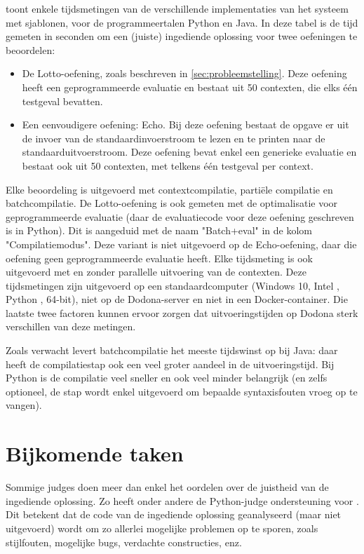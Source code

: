  toont enkele tijdsmetingen van de verschillende implementaties van het systeem met sjablonen, voor de programmeertalen Python en Java.
In deze tabel is de tijd gemeten in seconden om een (juiste) ingediende oplossing voor twee oefeningen te beoordelen:

\begin{itemize}
    \item De Lotto-oefening, zoals beschreven in \cref{sec:probleemstelling}.
    Deze oefening heeft een geprogrammeerde evaluatie en bestaat uit 50 contexten, die elks één testgeval bevatten.
    \item Een eenvoudigere oefening: Echo.
    Bij deze oefening bestaat de opgave er uit de invoer van de standaardinvoerstroom te lezen en te printen naar de standaarduitvoerstroom.
    Deze oefening bevat enkel een generieke evaluatie en bestaat ook uit 50 contexten, met telkens één testgeval per context.
\end{itemize}

Elke beoordeling is uitgevoerd met contextcompilatie, partiële compilatie en batchcompilatie.
De Lotto-oefening is ook gemeten met de optimalisatie voor geprogrammeerde evaluatie (daar de evaluatiecode voor deze oefening geschreven is in Python).
Dit is aangeduid met de naam "Batch+eval" in de kolom "Compilatiemodus".
Deze variant is niet uitgevoerd op de Echo-oefening, daar die oefening geen geprogrammeerde evaluatie heeft.
Elke tijdsmeting is ook uitgevoerd met en zonder parallelle uitvoering van de contexten.
Deze tijdsmetingen zijn uitgevoerd op een standaardcomputer (Windows 10, Intel , Python , 64-bit), niet op de Dodona-server en niet in een Docker-container.
Die laatste twee factoren kunnen ervoor zorgen dat uitvoeringstijden op Dodona sterk verschillen van deze metingen.

Zoals verwacht levert batchcompilatie het meeste tijdswinst op bij Java: daar heeft de compilatiestap ook een veel groter aandeel in de uitvoeringstijd.
Bij Python is de compilatie veel sneller en ook veel minder belangrijk (en zelfs optioneel, de stap wordt enkel uitgevoerd om bepaalde syntaxisfouten vroeg op te vangen).

\section{Bijkomende taken}\label{sec:andere-taken}

Sommige judges doen meer dan enkel het oordelen over de juistheid van de ingediende oplossing.
Zo heeft onder andere de Python-judge ondersteuning voor .
Dit betekent dat de code van de ingediende oplossing geanalyseerd (maar niet uitgevoerd) wordt om zo allerlei mogelijke problemen op te sporen, zoals stijlfouten, mogelijke bugs, verdachte constructies, enz.

